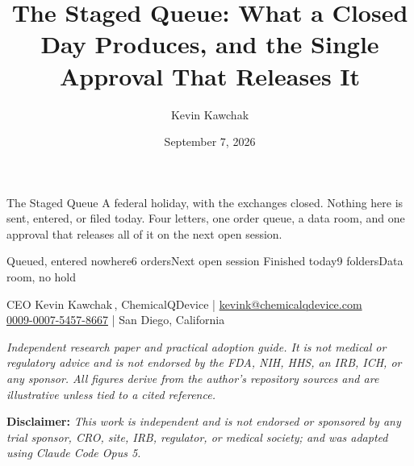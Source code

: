 \documentclass[11pt]{article}
\title{The Staged Queue: What a Closed Day Produces, and the Single Approval
That Releases It}
\author{Kevin Kawchak}
\date{September 7, 2026}
\begin{document}
\thispagestyle{plain}

%
{The Staged Queue}%
{A federal holiday, with the exchanges closed. Nothing here is sent, entered, or
filed today. Four letters, one order queue, a data room, and one approval that
releases all of it on the next open session.}

\vspace{0.15em}

\begin{center}
 \enspace {} \enspace
{} \enspace {} \enspace
{}
\end{center}

\vspace{-0.15em}

%
{Queued, entered nowhere}{6 orders}{Next open session}%
{Finished today}{9 folders}{Data room, no hold}

\vspace{-0.1em}
\apprule{0.9pt}

\begin{center}\small
CEO Kevin Kawchak\,, ChemicalQDevice \;|\;
\href{mailto:kevink@chemicalqdevice.com}{kevink@chemicalqdevice.com}\\
\href{https://orcid.org/0009-0007-5457-8667}{0009-0007-5457-8667} \;|\;
San Diego, California
\end{center}

\vspace{-0.25em}
\apprule{0.5pt}

\noindent\footnotesize\textit{Independent research paper and practical adoption
guide. It is not medical or regulatory advice and is not endorsed by the FDA,
NIH, HHS, an IRB, ICH, or any sponsor. All figures derive from the author's
repository sources and are illustrative unless tied to a cited
reference.}\normalsize\par

\vspace{0.12em}

\noindent\footnotesize\textbf{Disclaimer:} \textit{This work is independent and
is not endorsed or sponsored by any trial sponsor, CRO, site, IRB, regulator, or
medical society; and was adapted using Claude Code Opus 5.}\normalsize\par

\vspace{0.12em}
\end{document}
